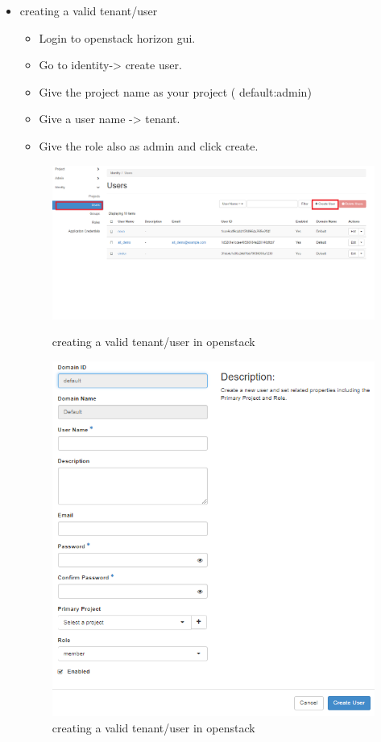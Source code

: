 \begin{itemize}
\item creating a valid tenant/user
\begin{itemize}
\item Login to openstack horizon gui.
\item Go to identity-> create user.
\item Give the project name as your project ( default:admin)
\item Give a user name -> tenant.
\item Give the role also as admin and click create.
\end{itemize}
\begin{figure} [H]
	\centering
	\includegraphics[width=0.5\linewidth]{figures/sh9}
	\caption{creating a valid tenant/user in openstack}
		\includegraphics[width=0.5\linewidth]{figures/sh10}
	\caption{creating a valid tenant/user in openstack}
\end{figure}


\end{itemize}
